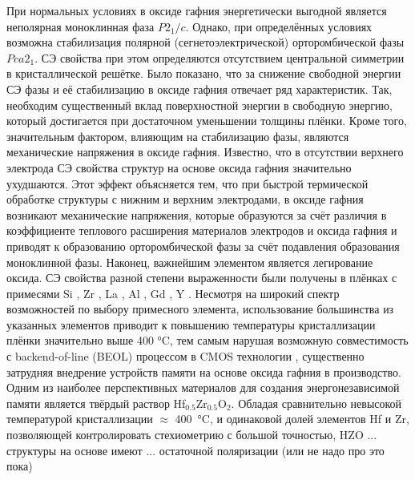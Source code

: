 При нормальных условиях в оксиде гафния энергетически выгодной является неполярная моноклинная фаза \(P2_1/c\). %
Однако, при определённых условиях возможна стабилизация полярной (сегнетоэлектрической) орторомбической фазы \(Pca2_1\). СЭ свойства при этом определяются отсутствием центральной симметрии в кристаллической решётке.
Было показано, что за снижение свободной энергии СЭ фазы и её стабилизацию в оксиде гафния отвечает ряд характеристик. Так, необходим существенный вклад поверхностной энергии в свободную энергию, который достигается при достаточном уменьшении толщины плёнки. Кроме того, значительным фактором, влияющим на стабилизацию фазы, являются механические напряжения в оксиде гафния. Известно, что в отсутствии верхнего электрода СЭ свойства структур на основе оксида гафния значительно ухудшаются. Этот эффект объясняется тем, что при быстрой термической обработке структуры с нижним и верхним электродами, в оксиде гафния возникают механические напряжения, которые образуются за счёт различия в коэффициенте теплового расширения материалов электродов и оксида гафния и приводят к образованию орторомбической фазы за счёт подавления образования моноклинной фазы. Наконец, важнейшим элементом является легирование оксида. СЭ свойства разной степени выраженности были получены в плёнках с примесями Si \cite{bosckeFerroelectricityHafniumOxide2011}, Zr \cite{bosckePhaseTransitionsFerroelectric2011}, La \cite{schroederLanthanumDopedHafniumOxide2018}, Al \cite{muellerIncipientFerroelectricityDoped2012}, Gd \cite{muellerFerroelectricityGdDopedHfO2012}, Y \cite{mullerFerroelectricityYttriumdopedHafnium2011}. Несмотря на широкий спектр возможностей по выбору примесного элемента, использование большинства из указанных элементов приводит к повышению температуры кристаллизации плёнки значительно выше 400 \si{\degreeCelsius}, тем самым нарушая возможную совместимость с backend-of-line (BEOL) процессом в CMOS технологии \cite{schmitzLowTemperatureThin2018}, существенно затрудняя внедрение устройств памяти на основе оксида гафния в производство. Одним из наиболее перспективных материалов для создания энергонезависимой памяти является твёрдый раствор Hf\(_{0.5}\)Zr\(_{0.5}\)O\(_2\). Обладая сравнительно невысокой температурой кристаллизации \(\approx\) \SI{400}{\degreeCelsius}, и одинаковой долей элементов Hf и Zr, позволяющей контролировать стехиометрию с большой точностью, HZO ... структуры на основе имеют ... остаточной поляризации (или не надо про это пока)
